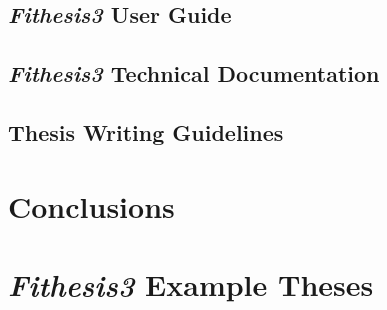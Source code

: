 \documentclass{article}
\begin{document}
  \subsection{\emph{Fithesis3} User Guide}
  \subsection{\emph{Fithesis3} Technical Documentation}
  \subsection{Thesis Writing Guidelines}
  \section{Conclusions}
  \renewcommand\thesection{\Alph{section}}
  \setcounter{section}{0}
  \section{\emph{Fithesis3} Example Theses}
\end{document}
